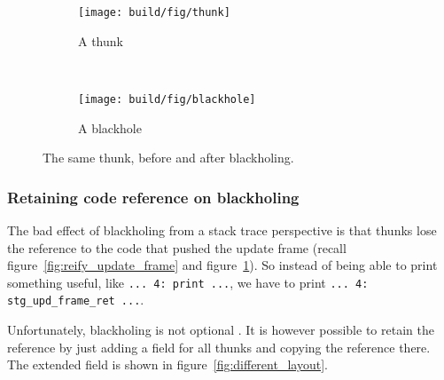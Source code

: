 \begin{figure}
\begin{mdframed}
  \begin{subfigure}[t]{0.5\textwidth}
    \texttt{[image: build/fig/thunk]}
    \caption{A thunk}
  \end{subfigure}
        ~ %
  \begin{subfigure}[t]{0.5\textwidth}
    \texttt{[image: build/fig/blackhole]}
    \caption{A blackhole}
  \end{subfigure}
  \caption{The same thunk, before and after blackholing.}\label{fig:thunks_and_blackholes}
\end{mdframed}
\end{figure}

\subsubsection{Retaining code reference on blackholing}

The bad effect of blackholing from a stack trace perspective is
that thunks lose the reference to the code that pushed the update frame (recall figure~\ref{fig:reify_update_frame} and figure~\ref{fig:thunks_and_blackholes}). So instead
of being able to print something useful, like  \texttt{... 4: print ...},
we have to print \texttt{... 4: stg\_upd\_frame\_ret ...}.

Unfortunately, blackholing is not optional
\cite{github_blackholing_not_optional}. It is however possible to
retain the reference by just adding a field for all thunks and
copying the reference there. The extended field is shown in figure~\ref{fig:different_layout}.

\begin{figure}
\end{figure}

